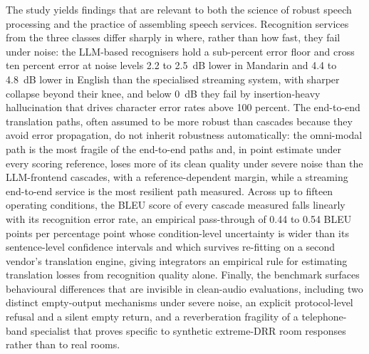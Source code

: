 The study yields findings that are relevant to both the science of robust
speech processing and the practice of assembling speech services. Recognition
services from the three classes differ sharply in where, rather than how
fast, they fail under noise: the LLM-based recognisers hold a sub-percent
error floor and cross ten percent error at noise levels 2.2 to 2.5~dB lower
in Mandarin and 4.4 to 4.8~dB lower in English than the specialised
streaming system, with sharper collapse beyond their
knee, and below 0~dB they fail by insertion-heavy hallucination that drives
character error rates above 100 percent. The end-to-end translation paths,
often assumed to be more robust
than cascades because they avoid error propagation, do not inherit
robustness automatically: the omni-modal path is the most fragile of the
end-to-end paths and, in point estimate under every scoring reference,
loses more of its clean
quality under severe noise than the LLM-frontend cascades, with a
reference-dependent margin, while a streaming
end-to-end service is the most resilient path measured. Across up to fifteen
operating conditions, the BLEU score of every cascade measured
falls linearly with its recognition error rate, an empirical pass-through of
0.44 to 0.54 BLEU points per percentage point whose condition-level
uncertainty is wider than its sentence-level confidence intervals and which
survives re-fitting on a second vendor's translation engine, giving
integrators an empirical rule for estimating
translation losses from recognition
quality alone. Finally, the benchmark surfaces behavioural differences that
are invisible in clean-audio evaluations, including two distinct
empty-output mechanisms under severe noise, an explicit protocol-level
refusal and a silent empty return, and a reverberation fragility of a
telephone-band specialist that proves specific to synthetic extreme-DRR
room responses rather than to real rooms.

